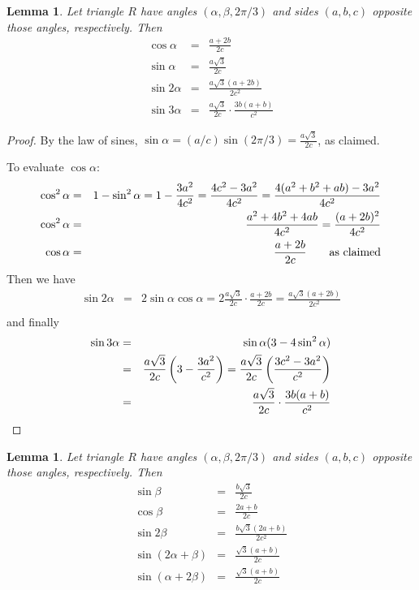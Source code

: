 \documentclass{amsart}
\theoremstyle{plain}
\newtheorem{lemma}[theorem]{Lemma}
\theoremstyle{definition}
\theoremstyle{remark}
\begin{document}
\begin{lemma} \label{lemma:claude}
Let triangle $R$ have angles $(\alpha,\beta,2\pi/3)$ and sides $(a,b,c)$ opposite
those angles, respectively. Then
\begin{eqnarray*}
\cos \alpha &=& \frac{a+2b} {2c} \\
\sin \alpha &=& \frac {a \sqrt 3}{2c}\\
\sin 2 \alpha &=& \frac {a \sqrt 3 (a+2b)}{2c^2}\\
\sin 3 \alpha 
&=&  \frac {a \sqrt 3}{2c} \cdot\frac {3b(a+b)}{c^2}
\end{eqnarray*}
\end{lemma}
 
\begin{proof}
By the law of sines, $\sin \alpha = (a/c) \sin (2\pi/3) = \frac {a \sqrt 3} {2c}$, as claimed.

To evaluate $\cos \alpha$: 
\begin{eqnarray*}
\cos^2 \alpha &=& 1- \sin^2 \alpha = 1- \frac {3a^2}{4c^2} = \frac{4c^2-3a^2}{4c^2} = \frac{4(a^2+b^2+ab)-3a^2}{4c^2} \\
\cos^2 \alpha  &=& \frac{a^2 + 4b^2+4ab}{4c^2} = \frac{(a+2b)^2}{4c^2} \\
\cos \alpha &=& \frac {a+2b} {2c} \mbox{\qquad as claimed}
\end{eqnarray*}
Then we have
\begin{eqnarray*}
\sin 2\alpha &=& 2 \sin \alpha \cos \alpha = 2\frac {a \sqrt 3} {2c} \cdot\frac{a+2b} {2c} = \frac {a \sqrt 3 (a+2b)}{2c^2}\\
\end{eqnarray*}
and finally 
\begin{eqnarray*}
\sin 3 \alpha &=& \sin \alpha (3 - 4 \sin^2 \alpha) \\
&=&  \frac {a \sqrt 3}{2c} \left(3 - \frac {3a^2}{c^2}\right)  = \frac {a \sqrt 3}{2c} \left( \frac{3c^2 - 3a^2}{c^2}\right)\\
&=&  \frac {a \sqrt 3}{2c} \cdot \frac {3b(a+b)}{c^2} \qedhere
\end{eqnarray*}
\end{proof}

\begin{lemma}\label{lemma:beta}
Let triangle $R$ have angles $(\alpha,\beta,2\pi/3)$ and sides $(a,b,c)$ opposite
those angles, respectively. Then
\begin{eqnarray*}
\sin \beta &=& \frac{b \sqrt 3}{2c}\\
\cos \beta &=& \frac {2a+b}{2c}\\
\sin 2 \beta &=& \frac {b \sqrt 3 (2a+b)}{2c^2}\\
\sin (2 \alpha +\beta) &=& \frac{\sqrt 3 (a+b)}{2c} \\
\sin (\alpha + 2 \beta)&=&\frac{\sqrt 3 (a+b)}{2c} 
\end{eqnarray*}
\end{lemma}
\end{document}
